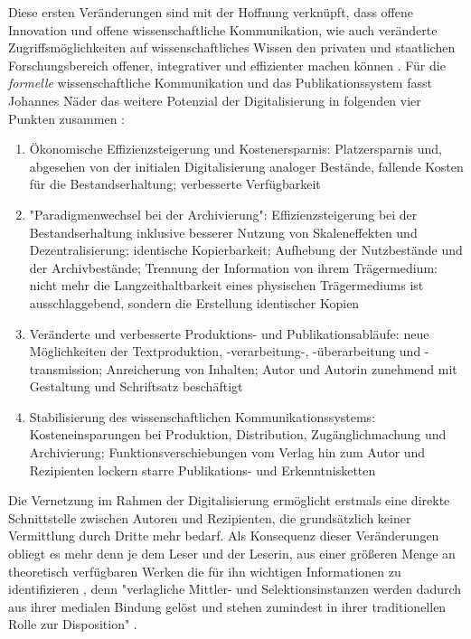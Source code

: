 Diese ersten Veränderungen sind mit der Hoffnung verknüpft, dass offene Innovation und offene wissenschaftliche Kommunikation, wie auch veränderte Zugriffsmöglichkeiten auf wissenschaftliches Wissen \cite[:109]{Naeder_2010} den privaten und staatlichen Forschungsbereich offener, integrativer und effizienter machen können \cite{Harmon_2012}. Für die \textit{formelle} wissenschaftliche Kommunikation und das Publikationssystem fasst Johannes Näder das weitere Potenzial der Digitalisierung in folgenden vier Punkten zusammen \cite[:66-76]{Naeder_2010}:
\begin{enumerate}
\item Ökonomische Effizienzsteigerung und Kostenersparnis: Platzersparnis und, abgesehen von der initialen Digitalisierung analoger Bestände, fallende Kosten für die Bestandserhaltung; verbesserte Verfügbarkeit
\item "Paradigmenwechsel bei der Archivierung": Effizienzsteigerung bei der Bestandserhaltung inklusive besserer Nutzung von Skaleneffekten und Dezentralisierung; identische Kopierbarkeit; Aufhebung der Nutzbestände und der Archivbestände; Trennung der Information von ihrem Trägermedium: nicht mehr die Langzeithaltbarkeit eines physischen Trägermediums ist ausschlaggebend, sondern die Erstellung identischer Kopien
\item Veränderte und verbesserte Produktions- und Publikationsabläufe: neue Möglichkeiten der Textproduktion, -verarbeitung-, -überarbeitung und -transmission; Anreicherung von Inhalten; Autor und Autorin zunehmend mit Gestaltung und Schriftsatz beschäftigt
\item Stabilisierung des wissenschaftlichen Kommunikationssystems: Kosteneinsparungen bei Produktion, Distribution, Zugänglichmachung und Archivierung; Funktionsverschiebungen vom Verlag hin zum Autor und Rezipienten lockern starre Publikations- und Erkenntnisketten
\end{enumerate}

Die Vernetzung im Rahmen der Digitalisierung ermöglicht erstmals eine direkte Schnittstelle zwischen Autoren und Rezipienten, die grundsätzlich keiner Vermittlung durch Dritte mehr bedarf. Als Konsequenz dieser Veränderungen obliegt es mehr denn je dem Leser und der Leserin, aus einer größeren Menge an theoretisch verfügbaren Werken die für ihn wichtigen Informationen zu identifizieren \cite{Hagner_2015}, denn "verlagliche Mittler- und Selektionsinstanzen werden dadurch aus ihrer medialen Bindung gelöst und stehen zumindest in ihrer traditionellen Rolle zur Disposition" \cite[:109]{Naeder_2010}.


